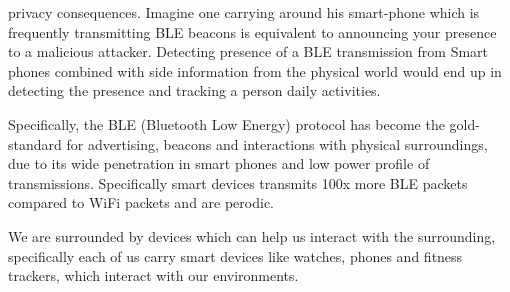 privacy consequences. Imagine
one carrying around his smart-phone which is frequently transmitting BLE
beacons is equivalent to announcing your presence to a malicious attacker.
Detecting presence of a BLE transmission from Smart phones combined with side
information from the physical world would end up in detecting the presence and
tracking a person daily activities.



Specifically, the BLE
(Bluetooth Low Energy) protocol has become the gold-standard for advertising,
beacons and interactions with physical surroundings, due to its wide
penetration in smart phones and low power profile of transmissions.  Specifically smart devices transmits 100x more BLE packets
compared to WiFi packets and are perodic. 



We are surrounded by devices which can help us interact with the surrounding,
specifically each of us carry smart devices like watches, phones and fitness
trackers, which interact with our environments. 

\fi
